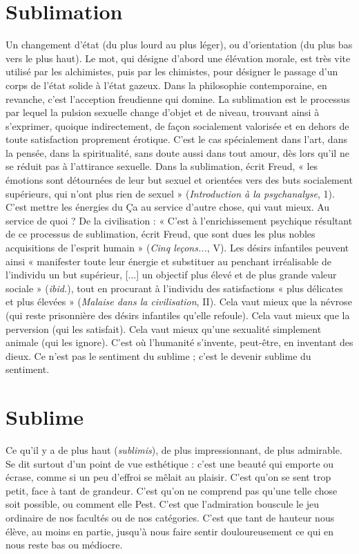 \section{Sublimation}
Un changement d’état (du plus lourd au plus léger), ou
d'orientation (du plus bas vers le plus haut). Le mot, qui
désigne d’abord une élévation morale, est très vite utilisé par les alchimistes,
puis par les chimistes, pour désigner le passage d’un corps de l’état solide à
l’état gazeux. Dans la philosophie contemporaine, en revanche, c’est l’acception
freudienne qui domine. La sublimation est le processus par lequel la pulsion
sexuelle change d’objet et de niveau, trouvant ainsi à s'exprimer,
quoique indirectement, de façon socialement valorisée et en dehors de toute
satisfaction proprement érotique. C’est le cas spécialement dans l’art, dans la
pensée, dans la spiritualité, sans doute aussi dans tout amour, dès lors qu’il
ne se réduit pas à l’attirance sexuelle. Dans la sublimation, écrit Freud, « les
émotions sont détournées de leur but sexuel et orientées vers des buts socialement
supérieurs, qui n’ont plus rien de sexuel » ({\it Introduction à la psychanalyse},
1). C’est mettre les énergies du Ça au service d’autre chose, qui vaut
mieux. Au service de quoi ? De la civilisation : « C’est à l'enrichissement psychique
résultant de ce processus de sublimation, écrit Freud, que sont dues
les plus nobles acquisitions de l’esprit humain » ({\it Cinq leçons...}, V). Les désirs
infantiles peuvent ainsi « manifester toute leur énergie et substituer au penchant
irréalisable de l'individu un but supérieur, [...] un objectif plus élevé
et de plus grande valeur sociale » ({\it ibid.}), tout en procurant à l'individu des
satisfactions « plus délicates et plus élevées » ({\it Malaise dans la civilisation}, II).
Cela vaut mieux que la névrose (qui reste prisonnière des désirs infantiles
qu’elle refoule). Cela vaut mieux que la perversion (qui les satisfait). Cela
vaut mieux qu’une sexualité simplement animale (qui les ignore). C’est où
l'humanité s’invente, peut-être, en inventant des dieux. Ce n’est pas le sentiment
du sublime ; c’est le devenir sublime du sentiment.

\section{Sublime}
Ce qu'il y a de plus haut ({\it sublimis}), de plus impressionnant, de
plus admirable. Se dit surtout d’un point de vue esthétique : c’est
une beauté qui emporte ou écrase, comme si un peu d’effroi se mêlait au plaisir.
C’est qu’on se sent trop petit, face à tant de grandeur. C’est qu'on ne comprend
pas qu’une telle chose soit possible, ou comment elle Pest. C’est que
l'admiration bouscule le jeu ordinaire de nos facultés ou de nos catégories.
C’est que tant de hauteur nous élève, au moins en partie, jusqu’à nous faire
sentir douloureusement ce qui en nous reste bas ou médiocre.

